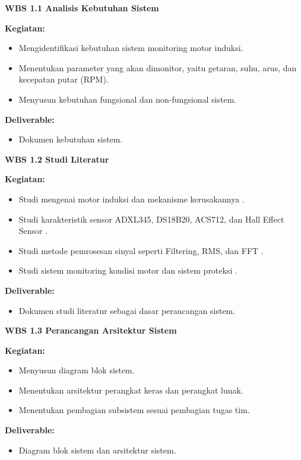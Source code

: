 \documentclass{elsinta}
\begin{document}
\textbf{WBS 1.1 Analisis Kebutuhan Sistem}

\textbf{Kegiatan:}
\begin{itemize}
    \item Mengidentifikasi kebutuhan sistem monitoring motor induksi.
    \item Menentukan parameter yang akan dimonitor, yaitu getaran, suhu, arus, dan kecepatan putar (RPM).
    \item Menyusun kebutuhan fungsional dan non-fungsional sistem.
\end{itemize}

\textbf{Deliverable:}
\begin{itemize}
    \item Dokumen kebutuhan sistem.
\end{itemize}

\textbf{WBS 1.2 Studi Literatur}

\textbf{Kegiatan:}
\begin{itemize}
    \item Studi mengenai motor induksi dan mekanisme kerusakannya \cite{nandi2005}.
    \item Studi karakteristik sensor ADXL345, DS18B20, ACS712, dan Hall Effect Sensor \cite{ADXL345,ACS712,A3144}.
    \item Studi metode pemrosesan sinyal seperti Filtering, RMS, dan FFT \cite{oppenheim2010,randall2011}.
    \item Studi sistem monitoring kondisi motor dan sistem proteksi \cite{jardine2006}.
\end{itemize}

\textbf{Deliverable:}
\begin{itemize}
    \item Dokumen studi literatur sebagai dasar perancangan sistem.
\end{itemize}

\textbf{WBS 1.3 Perancangan Arsitektur Sistem}

\textbf{Kegiatan:}
\begin{itemize}
    \item Menyusun diagram blok sistem.
    \item Menentukan arsitektur perangkat keras dan perangkat lunak.
    \item Menentukan pembagian subsistem sesuai pembagian tugas tim.
\end{itemize}

\textbf{Deliverable:}
\begin{itemize}
    \item Diagram blok sistem dan arsitektur sistem.
\end{itemize}
\end{document}
